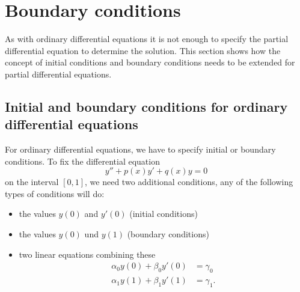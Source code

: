 %
%
%
\section{Boundary conditions\label{klassifikation:randbedingungen}}
As with ordinary differential equations it is not enough to 
specify the partial differential equation to determine the
solution.
This section shows how the concept of initial conditions and boundary
conditions needs to be extended for partial differential equations.

\subsection{Initial and boundary conditions for ordinary differential equations\label{klassifkation:anfangswerte-ode}}
For ordinary differential equations, we have to specify initial or boundary
conditions.
To fix the differential equation
\[
y''+p(x)y'+q(x)y=0
\]
on the interval
$[0,1]$,
we need two additional conditions, any of the following types of conditions
will do:
\begin{itemize}
\item the values $y(0)$ and $y'(0)$ (initial conditions)
\item the values $y(0)$ und $y(1)$ (boundary conditions)
\item two linear equations combining these
\begin{align*}
\alpha_0y(0)+\beta_0y'(0)&=\gamma_0\\
\alpha_1y(1)+\beta_1y'(1)&=\gamma_1.
\end{align*}
\end{itemize}

